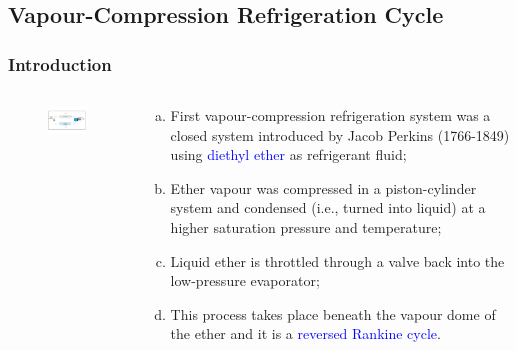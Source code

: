\documentclass[10pt,compress,handout,ignorenonframetext]{beamer}
\begin{document}

\subsection{Vapour-Compression Refrigeration Cycle}
\begin{frame}
 \frametitle{Introduction}
  \begin{columns}
   \begin{column}[c]{0.5\linewidth}
    \begin{figure}%
     \begin{center}
      \includegraphics[width=5.8cm,clip]{./Pics/Overview_Refrig12}
     \end{center}
    \end{figure}  
   \end{column}  
   \begin{column}[c]{0.5\linewidth}
  \begin{enumerate}[(a)]
   \item <1-> First vapour-compression refrigeration system was a closed system introduced by Jacob Perkins (1766-1849) using \textcolor{blue}{diethyl ether} as refrigerant fluid;
   \item <2-> Ether vapour was compressed in a piston-cylinder system and condensed (i.e., turned into liquid) at a higher saturation pressure and temperature;
   \item <3-> Liquid ether is throttled through a valve back into the low-pressure evaporator;
   \item <4-> This process takes place beneath the vapour dome of the ether and it is a \textcolor{blue}{reversed Rankine cycle}.
  \end{enumerate}
 \end{column}  
\end{columns}
\end{frame}
\end{document}
